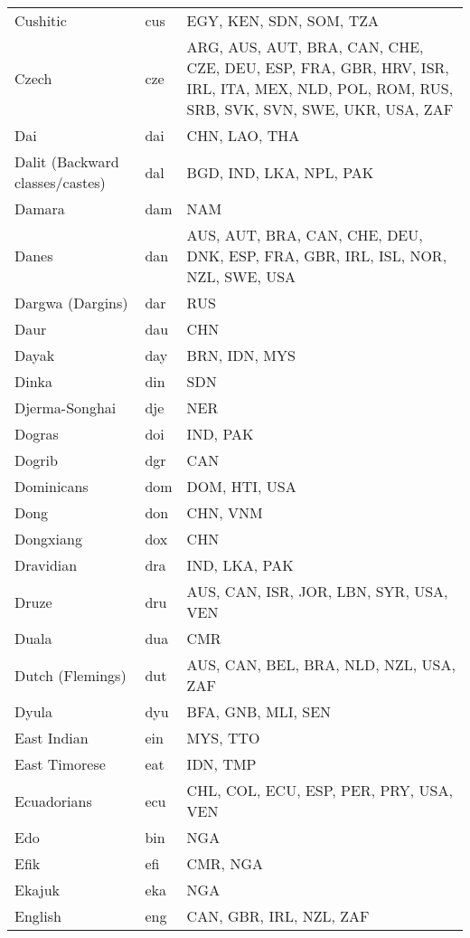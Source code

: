 \documentclass[12pt]{article}
\begin{document}
\begin{center}
\begin{longtable}{|p{7cm}|p{1cm}|p{7cm}|}
Cushitic	&	cus 	&	EGY, KEN, SDN, SOM, TZA	\\	\cline{1-3}
Czech	&	cze	&	ARG, AUS, AUT, BRA, CAN, CHE, CZE, DEU, ESP, FRA, GBR, HRV, ISR, IRL, ITA, MEX, NLD, POL, ROM, RUS, SRB, SVK, SVN, SWE, UKR, USA, ZAF	\\	\cline{1-3}
Dai	&	dai	&	CHN, LAO, THA	\\	\cline{1-3}
Dalit (Backward classes/castes)	&	dal	&	BGD, IND, LKA, NPL, PAK	\\	\cline{1-3}
Damara	&	dam	&	NAM	\\	\cline{1-3}
Danes	&	dan 	&	AUS, AUT, BRA, CAN, CHE, DEU, DNK, ESP, FRA, GBR, IRL, ISL, NOR, NZL, SWE, USA	\\	\cline{1-3}
Dargwa (Dargins)	&	dar 	&	RUS	\\	\cline{1-3}
Daur	&	dau	&	CHN	\\	\cline{1-3}
Dayak	&	day 	&	BRN, IDN, MYS	\\	\cline{1-3}
Dinka	&	din 	&	SDN	\\	\cline{1-3}
Djerma-Songhai	&	dje	&	NER	\\	\cline{1-3}
Dogras	&	doi 	&	IND, PAK	\\	\cline{1-3}
Dogrib	&	dgr 	&	CAN	\\	\cline{1-3}
Dominicans	&	dom	&	DOM, HTI, USA	\\	\cline{1-3}
Dong	&	don	&	CHN, VNM	\\	\cline{1-3}
Dongxiang	&	dox	&	CHN	\\	\cline{1-3}
Dravidian	&	dra 	&	IND, LKA, PAK	\\	\cline{1-3}
Druze	&	dru	&	AUS, CAN, ISR, JOR, LBN, SYR, USA, VEN	\\	\cline{1-3}
Duala	&	dua 	&	CMR	\\	\cline{1-3}
Dutch (Flemings)	&	dut	&	AUS, CAN, BEL, BRA, NLD, NZL, USA, ZAF	\\	\cline{1-3}
Dyula	&	dyu 	&	BFA, GNB, MLI, SEN	\\	\cline{1-3}
East Indian	&	ein	&	MYS, TTO	\\	\cline{1-3}
East Timorese	&	eat	&	IDN, TMP	\\	\cline{1-3}
Ecuadorians	&	ecu	&	CHL, COL, ECU, ESP, PER, PRY, USA, VEN	\\	\cline{1-3}
Edo	&	bin 	&	NGA	\\	\cline{1-3}
Efik	&	efi 	&	CMR, NGA	\\	\cline{1-3}
Ekajuk	&	eka 	&	NGA	\\	\cline{1-3}
English	&	eng 	&	CAN, GBR, IRL, NZL, ZAF	\\	\cline{1-3}

\end{longtable}
\end{center}
\end{document}
